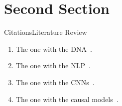 \section{Second Section}

\begin{frame}{Citations}{Literature Review }
  \begin{enumerate}
    \item The one with the DNA~\parencite{geraci2019technology}.
    \item The one with the NLP~\parencite{massidda2020rmassidda}.
    \item The one with the CNNs~\parencite{massidda2023knowledge}.
    \item The one with the causal models~\parencite{massidda2023causal}.
  \end{enumerate}
\end{frame}
